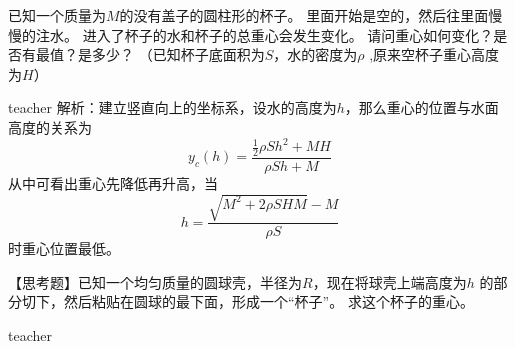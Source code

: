 \begin{example}

已知一个质量为$M$的没有盖子的圆柱形的杯子。
里面开始是空的，然后往里面慢慢的注水。
进入了杯子的水和杯子的总重心会发生变化。
请问重心如何变化？是否有最值？是多少？
（已知杯子底面积为$S$，水的密度为$\rho$ ,原来空杯子重心高度为$H$）
\begin{taggedblock}{teacher}
\vspace*{4cm}
\newline
解析：建立竖直向上的坐标系，设水的高度为$h$，那么重心的位置与水面高度的关系为
\[
y_c(h) = \frac{\frac{1}{2}\rho S h^2+MH}{\rho S h + M}
\]
从中可看出重心先降低再升高，当
\[
h = \frac{\sqrt{M^2+2\rho SHM}-M}{\rho S}
\]
时重心位置最低。
\end{taggedblock}
\end{example}


\begin{example}
【思考题】已知一个均匀质量的圆球壳，半径为$R$，现在将球壳上端高度为$h$ 的部分切下，然后粘贴在圆球的最下面，形成一个“杯子”。
求这个杯子的重心。

\begin{taggedblock}{teacher}


\end{taggedblock}
\end{example}


